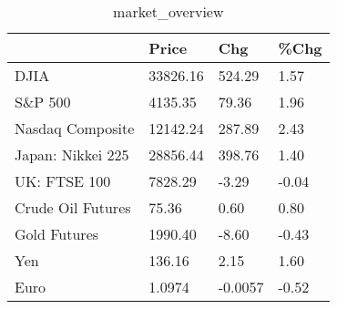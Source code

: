 \documentclass{article}%
\begin{document}
%


\begin{table}[htbp]%
\caption{market\_overview}%
\centering%
\begin{adjustbox}{width=1\textwidth}%
\begin{tabular}{llll}
\toprule
                  &    Price &     Chg &  \%Chg \\
\midrule
             DJIA & 33826.16 &  524.29 &  1.57 \\
          S\&P 500 &  4135.35 &   79.36 &  1.96 \\
 Nasdaq Composite & 12142.24 &  287.89 &  2.43 \\
Japan: Nikkei 225 & 28856.44 &  398.76 &  1.40 \\
     UK: FTSE 100 &  7828.29 &   -3.29 & -0.04 \\
Crude Oil Futures &    75.36 &    0.60 &  0.80 \\
     Gold Futures &  1990.40 &   -8.60 & -0.43 \\
              Yen &   136.16 &    2.15 &  1.60 \\
             Euro &   1.0974 & -0.0057 & -0.52 \\
\bottomrule
\end{tabular}
%
\end{adjustbox}%
\end{table}

%
\end{document}
